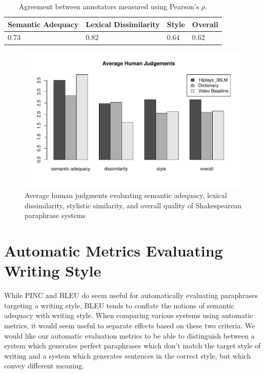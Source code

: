\documentclass[10pt,a5paper,twoside]{article}
\begin{document}
\begin{table}[ht]
  \begin{center}
    \begin{tabular}{|l|l|l|l|}
      \hline
      Semantic Adequacy & Lexical Dissimilarity & Style & Overall \\
      \hline
      \hline
      0.73 & 0.82 & 0.64 & 0.62 \\
      \hline
    \end{tabular}
  \end{center}
  \caption{Agreement between annotators measured using Pearson's $\rho$.}
  \label{annotator_agreement}
\end{table}

\begin{figure}
  \begin{center}
    \includegraphics[width=5in]{figures/human_judgements.pdf}
  \end{center}
  \caption{Average human judgments evaluating semantic adequacy, lexical dissimilarity, stylistic similarity, and overall quality
    of Shakespearean paraphrase systems} 
  \label{human_judgements}
\end{figure}

\section{Automatic Metrics Evaluating Writing Style}
While PINC and BLEU do seem useful for automatically evaluating paraphrases targeting a  writing style, BLEU tends to conflate the notions of
semantic adequacy with writing style.  When comparing various systems using automatic metrics, it would seem useful
to separate effects based on these two criteria.  We would like our automatic evaluation metrics to be able to distinguish
between a system which generates perfect paraphrases which don't match the target style of writing and a system which
generates sentences in the correct style, but which convey different meaning.
\end{document}
